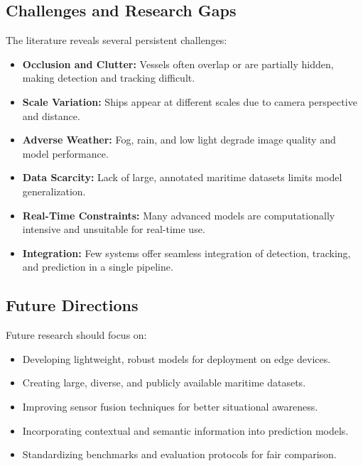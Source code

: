 \subsection{Challenges and Research Gaps}
The literature reveals several persistent challenges:
\begin{itemize}
	\item \textbf{Occlusion and Clutter:} Vessels often overlap or are partially hidden, making detection and tracking difficult.
	\item \textbf{Scale Variation:} Ships appear at different scales due to camera perspective and distance.
	\item \textbf{Adverse Weather:} Fog, rain, and low light degrade image quality and model performance.
	\item \textbf{Data Scarcity:} Lack of large, annotated maritime datasets limits model generalization.
	\item \textbf{Real-Time Constraints:} Many advanced models are computationally intensive and unsuitable for real-time use.
	\item \textbf{Integration:} Few systems offer seamless integration of detection, tracking, and prediction in a single pipeline.
\end{itemize}

\subsection{Future Directions}
Future research should focus on:
\begin{itemize}
	\item Developing lightweight, robust models for deployment on edge devices.
	\item Creating large, diverse, and publicly available maritime datasets.
	\item Improving sensor fusion techniques for better situational awareness.
	\item Incorporating contextual and semantic information into prediction models.
	\item Standardizing benchmarks and evaluation protocols for fair comparison.
\end{itemize}

